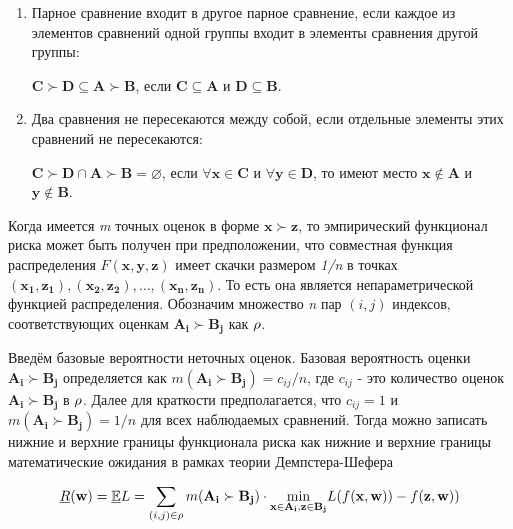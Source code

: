 \documentclass[12pt,a4paper,oneside]{article}
\begin{document}
\begin{enumerate}
\item Парное сравнение входит в другое парное сравнение, если каждое из элементов сравнений одной группы входит в элементы сравнения другой группы:

\begin{center}
\(\mathbf{C} \succ \mathbf{D} \subseteq \mathbf{A} \succ \mathbf{B}\), если \(\mathbf{C} \subseteq \mathbf{A}\) и \(\mathbf{D} \subseteq \mathbf{B}\).
\end{center}

\item Два сравнения не пересекаются между собой, если отдельные элементы этих сравнений не пересекаются:

\begin{center}
\(\mathbf{C} \succ \mathbf{D} \cap \mathbf{A} \succ \boldsymbol{B} = \varnothing\), если \(\forall\mathbf{x} \in \mathbf{C}\) и \(\forall\mathbf{y} \in \mathbf{D}\), то имеют место \(\mathbf{x} \notin \mathbf{A}\) и \(\mathbf{y} \notin \mathbf{B}\).
\end{center}

\end{enumerate}

\par 
Когда имеется \emph{m} точных оценок в форме \(\mathbf{x} \succ \mathbf{z}\), то эмпирический функционал риска может быть получен при предположении, что совместная функция распределения \(F(\mathbf{x}, \mathbf{y}, \mathbf{z})\) имеет скачки размером \emph{1/n} в точках \((\mathbf{x_1}, \mathbf{z_1}), (\mathbf{x_2}, \mathbf{z_2}), \dots, (\mathbf{x_n}, \mathbf{z_n})\). 
То есть она является непараметрической функцией распределения. 
Обозначим множество \emph{n} пар \((i, j)\) индексов, соответствующих оценкам \(\mathbf{A_i} \succ \mathbf{B_j}\) как \(\mathrm{\rho}\). 

\par
Введём базовые вероятности неточных оценок. 
Базовая вероятность оценки \(\mathbf{A_i} \succ \mathbf{B_j}\) определяется как \(m(\mathbf{A_i} \succ \mathbf{B_j}) = c_{ij} / n\), где \(c_{ij}\) - это количество оценок \(\mathbf{A_i} \succ \mathbf{B_j}\) в \(\mathrm{\rho}\). 
Далее для краткости предполагается, что \(c_{ij} = 1\) и \(m(\mathbf{A_i} \succ \mathbf{B_j}) = 1/n\) для всех наблюдаемых сравнений. 
Тогда можно записать нижние и верхние границы функционала риска как нижние и верхние границы математические ожидания в рамках теории Демпстера-Шефера

\[
\underline{R}(\mathbf{w}) = \mathbb{\underline{E}}L = \sum \limits_{(i,j) \in \Rho} m(\mathbf{A_i} \succ \mathbf{B_j}) \cdot \underset{%
	\mathbf{x} \in \mathbf{A_i}, \mathbf{z} \in \mathbf{B_j}%
}{\operatorname{min}} %
L(f(\mathbf{x}, \mathbf{w})) - f(\mathbf{z}, \mathbf{w}))
\]
\end{document}
